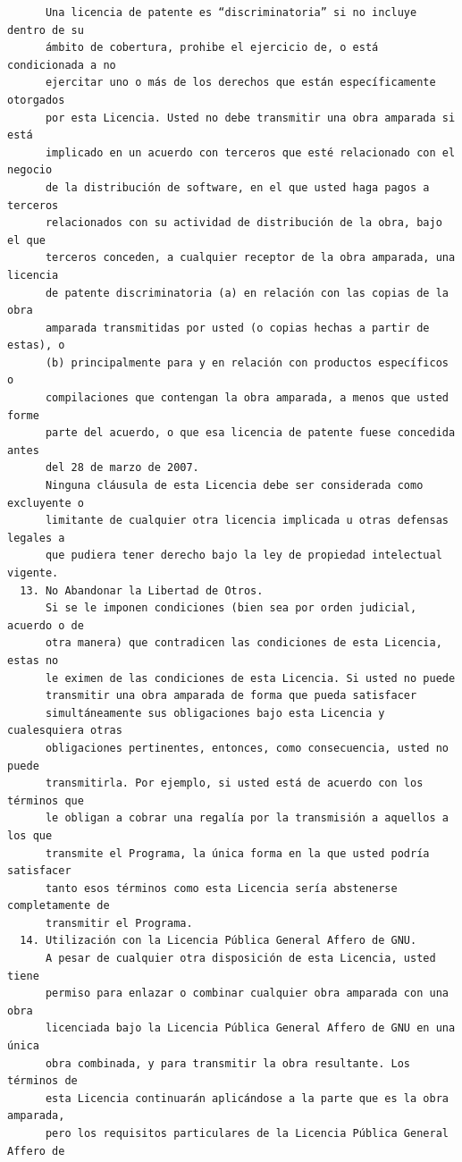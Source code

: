 \begin{verbatim}
      Una licencia de patente es “discriminatoria” si no incluye dentro de su
      ámbito de cobertura, prohibe el ejercicio de, o está condicionada a no
      ejercitar uno o más de los derechos que están específicamente otorgados
      por esta Licencia. Usted no debe transmitir una obra amparada si está
      implicado en un acuerdo con terceros que esté relacionado con el negocio
      de la distribución de software, en el que usted haga pagos a terceros
      relacionados con su actividad de distribución de la obra, bajo el que
      terceros conceden, a cualquier receptor de la obra amparada, una licencia
      de patente discriminatoria (a) en relación con las copias de la obra
      amparada transmitidas por usted (o copias hechas a partir de estas), o
      (b) principalmente para y en relación con productos específicos o
      compilaciones que contengan la obra amparada, a menos que usted forme
      parte del acuerdo, o que esa licencia de patente fuese concedida antes
      del 28 de marzo de 2007.
      Ninguna cláusula de esta Licencia debe ser considerada como excluyente o
      limitante de cualquier otra licencia implicada u otras defensas legales a
      que pudiera tener derecho bajo la ley de propiedad intelectual vigente.
  13. No Abandonar la Libertad de Otros.
      Si se le imponen condiciones (bien sea por orden judicial, acuerdo o de
      otra manera) que contradicen las condiciones de esta Licencia, estas no
      le eximen de las condiciones de esta Licencia. Si usted no puede
      transmitir una obra amparada de forma que pueda satisfacer
      simultáneamente sus obligaciones bajo esta Licencia y cualesquiera otras
      obligaciones pertinentes, entonces, como consecuencia, usted no puede
      transmitirla. Por ejemplo, si usted está de acuerdo con los términos que
      le obligan a cobrar una regalía por la transmisión a aquellos a los que
      transmite el Programa, la única forma en la que usted podría satisfacer
      tanto esos términos como esta Licencia sería abstenerse completamente de
      transmitir el Programa.
  14. Utilización con la Licencia Pública General Affero de GNU.
      A pesar de cualquier otra disposición de esta Licencia, usted tiene
      permiso para enlazar o combinar cualquier obra amparada con una obra
      licenciada bajo la Licencia Pública General Affero de GNU en una única
      obra combinada, y para transmitir la obra resultante. Los términos de
      esta Licencia continuarán aplicándose a la parte que es la obra amparada,
      pero los requisitos particulares de la Licencia Pública General Affero de

\end{verbatim}
